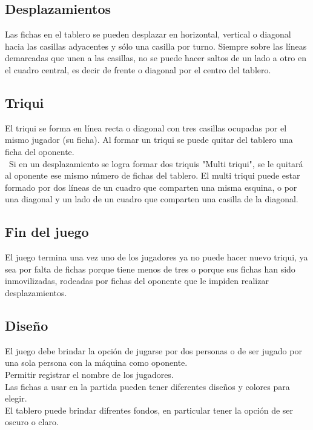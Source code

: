 \documentclass{article}
\begin{document}
\subsection {Desplazamientos}

Las fichas en el tablero se pueden desplazar en horizontal, vertical o diagonal hacia las casillas adyacentes y sólo una casilla por turno. Siempre sobre las líneas demarcadas que unen a las casillas, no se puede hacer saltos de un lado a otro en el cuadro central, es decir de frente o diagonal por el centro del tablero.

\subsection {Triqui}

El triqui se forma en línea recta o diagonal con tres casillas ocupadas por el mismo jugador (su ficha). Al formar un triqui se puede quitar del tablero una ficha del oponente.\\\
Si en un desplazamiento se logra formar dos triquis "Multi triqui", se le quitará al oponente ese mismo número de fichas del tablero.
El multi triqui puede estar formado por dos líneas de un cuadro que comparten una misma esquina, o por una diagonal y un lado de un cuadro que comparten una casilla de la diagonal.

\subsection {Fin del juego}

El juego termina una vez uno de los jugadores ya no puede hacer nuevo triqui, ya sea por falta de fichas porque tiene menos de tres o porque sus fichas han sido inmovilizadas, rodeadas por fichas del oponente que le impiden realizar desplazamientos.

\subsection {Diseño}

El juego debe brindar la opción de jugarse por dos personas o de ser jugado por una sola persona con la máquina como oponente.\\
Permitir registrar el nombre de los jugadores.\\
Las fichas a usar en la partida pueden tener diferentes diseños y colores para elegir.\\
El tablero puede brindar difrentes fondos, en particular tener la opción de ser oscuro o claro.\\
\end{document}
